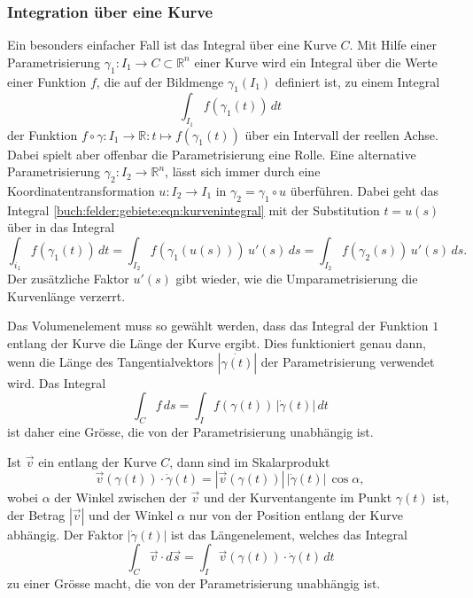 %
%
\subsubsection{Integration über eine Kurve}
Ein besonders einfacher Fall ist das Integral über eine Kurve $C$.
Mit Hilfe einer Parametrisierung $\gamma_1\colon I_1\to C\subset \mathbb{R}^n$
einer Kurve wird ein Integral über die Werte einer Funktion $f$, die auf
der Bildmenge $\gamma_1(I_1)$ definiert ist, zu einem Integral
\begin{equation}
\int_{I_1}
f(\gamma_1(t))
\,dt
\label{buch:felder:gebiete:eqn:kurvenintegral}
\end{equation}
der Funktion $f\circ\gamma\colon I_1\to\mathbb{R}:t\mapsto f(\gamma_1(t))$
über ein Intervall der reellen Achse.
Dabei spielt aber offenbar die Parametrisierung eine Rolle.
Eine alternative Parametrisierung $\gamma_2\colon I_2\to\mathbb{R}^n$,
lässt sich immer durch eine Koordinatentransformation $u\colon I_2\to I_1$
in $\gamma_2 = \gamma_1\circ u$ überführen.
Dabei geht das Integral
\eqref{buch:felder:gebiete:eqn:kurvenintegral}
mit der Substitution $t=u(s)$
über in das Integral
\[
\int_{i_1}
f(\gamma_1(t))
\,dt
=
\int_{I_2}
f(\gamma_1(u(s)))
\,
u'(s)
\,ds
=
\int_{I_2}
f(\gamma_2(s))
\,
u'(s)
\,ds.
\]
Der zusätzliche Faktor $u'(s)$ gibt wieder, wie die Umparametrisierung
die Kurvenlänge verzerrt.

Das Volumenelement muss so gewählt werden, dass das Integral der Funktion
$1$ entlang der Kurve die Länge der Kurve ergibt.
Dies funktioniert genau dann, wenn die Länge des Tangentialvektors
$|\dot{\gamma(t)}|$ der Parametrisierung verwendet wird.
Das Integral
\[
\int_C f\,ds
=
\int_I f(\gamma(t))\,|\dot{\gamma}(t)|\,dt
\]
ist daher eine Grösse, die von der Parametrisierung unabhängig ist.

Ist $\vec{v}$ ein entlang der Kurve $C$, dann sind im Skalarprodukt
\[
\vec{v}(\gamma(t))\cdot \dot{\gamma}(t)
=
|\vec{v}(\gamma(t))| \, |\dot{\gamma}(t)|\, \cos \alpha,
\]
wobei $\alpha$ der Winkel zwischen der $\vec{v}$ und der Kurventangente
im Punkt $\gamma(t)$ ist, der Betrag $|\vec{v}|$ und der Winkel $\alpha$
nur von der Position entlang der Kurve abhängig.
Der Faktor $|\dot{\gamma}(t)|$ ist das Längenelement, welches das Integral
\[
\int_C \vec{v}\cdot d\vec{s}
=
\int_I \vec{v}(\gamma(t))\cdot \dot{\gamma}(t)\,dt
\]
zu einer Grösse macht, die von der Parametrisierung unabhängig ist.

%
%
